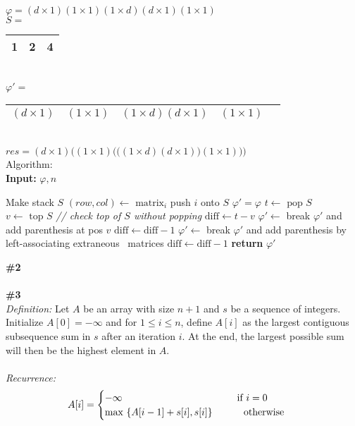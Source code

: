 \documentclass{article}
\newcommand\tab[1][1cm]{\hspace*{#1}}
\begin{document}
\\
\\
$\varphi = (d \times 1)(1 \times 1)(1 \times d)(d \times 1)(1 \times 1)$
\\
$S = $
\begin{tabular}{ |c|c|c| } 
 \hline
 1 & 2 & 4\\
 \hline
\end{tabular}
\\
$\varphi' = $
\begin{tabular}{ |c|c|c|c|c } 
 \hline
 $(d \times 1)$ & $(1 \times 1)$ & $(1 \times d)(d \times 1)$ & $(1 \times 1)$ \\
 \hline
\end{tabular}
\\
$res = (d \times 1) \bigg((1 \times 1) \bigg( \bigg( (1 \times d) (d \times 1) \bigg) (1 \times 1) \bigg) \bigg) $
\\
Algorithm:\\
\textbf{Input:} $\varphi, n$
\begin{algorithmic}
\State Make stack $S$
  \State $(row, col) \gets \text{ matrix}_i$
    \State push $i$ onto $S$
  \EndIf
\EndFor
\State $\varphi' = \varphi$
  \State $t \gets \text{ pop } S$
  \State $v \gets \text{ top } S$ \textit{// check top of $S$ without popping}
  \State $\text{diff} \gets t - v$
    \State $\varphi' \gets$ break $\varphi'$ and add parenthesis at pos $v$
    \State $\text{diff} \gets \text{diff} - 1$
      \State $\varphi' \gets$ break $\varphi'$ and add parenthesis by left-associating extraneous \tab\tab\ matrices 
      \State $\text{diff} \gets \text{diff} - 1$
    \EndWhile
  \EndIf
\EndWhile
\State \textbf{return} $\varphi'$
\\
\end{algorithmic}
\textbf{\#2}
\\
\\
\textbf{\#3}\\
\textit{Definition:} Let $A$ be an array with size $n+1$ and $s$ be a sequence of integers. Initialize $A[0] = - \infty$ and for $1 \leq i \leq n$, define $A[i]$ as the largest contiguous subsequence sum in $s$ after an iteration $i$.  At the end, the largest possible sum will then be the highest element in $A$.\\
\\
\textit{Recurrence:}
\begin{gather*}
A[i] =
\begin{cases}
-\infty \tab\tab\tab\tab\text{   } $if $i = 0 \\
\text{max } \{A[i-1] + s[i], s[i]\} \tab $ otherwise $
\end{cases}
\end{gather*}\\
\end{document}
